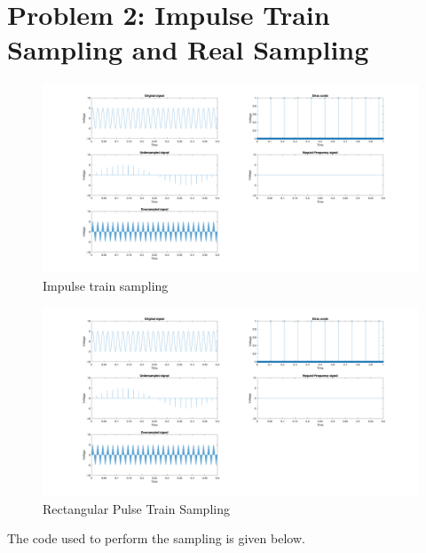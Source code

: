 \section{Problem 2: Impulse Train Sampling and Real Sampling}

\begin{figure}[H]
      \centering
      \includegraphics[width=\textwidth]{images/problem2_part1.png}
      \caption{Impulse train sampling}
      \label{fig:impulse_train_sampling}
\end{figure}

\begin{figure}[H]
      \centering
      \includegraphics[width=\textwidth]{images/problem2_part1.png}
      \caption{Rectangular Pulse Train Sampling}
\end{figure}

The code used to perform the sampling is given below.

